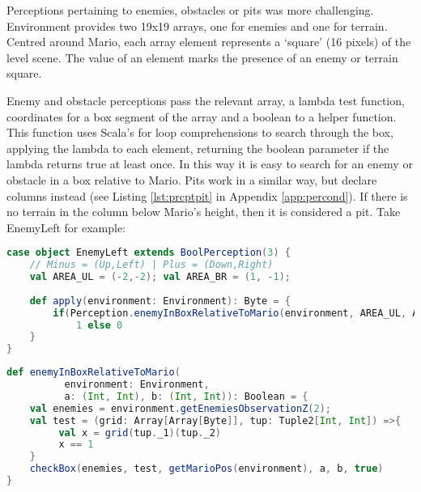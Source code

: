 Perceptions pertaining to enemies, obstacles or pits was more challenging. Environment provides two 19x19 arrays, one for enemies and one for terrain. Centred around Mario, each array element represents a `square' (16 pixels) of the level scene. The value of an element marks the presence of an enemy or terrain square. 

Enemy and obstacle perceptions pass the relevant array, a lambda test function, coordinates for a box segment of the array and a boolean to a helper function. This function uses Scala's for loop comprehensions to search through the box, applying the lambda to each element, returning the boolean parameter if the lambda returns true at least once. In this way it is easy to search for an enemy or obstacle in a box relative to Mario. Pits work in a similar way, but declare columns instead (see Listing \ref{lst:prcptpit} in Appendix \ref{app:percond}). If there is no terrain in the column below Mario's height, then it is considered a pit. Take EnemyLeft for example:

\begin{minipage}{0.9\linewidth}
\centering
\begin{lstlisting}[language=scala]
case object EnemyLeft extends BoolPerception(3) {
    // Minus = (Up,Left) | Plus = (Down,Right)
    val AREA_UL = (-2,-2); val AREA_BR = (1, -1);
  
    def apply(environment: Environment): Byte = {
        if(Perception.enemyInBoxRelativeToMario(environment, AREA_UL, AREA_BR)) 
            1 else 0  
    }
}
\end{lstlisting}
\end{minipage}

\begin{minipage}{0.9\linewidth}
\centering
\begin{lstlisting}[language=scala]
def enemyInBoxRelativeToMario(
          environment: Environment, 
          a: (Int, Int), b: (Int, Int)): Boolean = {
    val enemies = environment.getEnemiesObservationZ(2);
    val test = (grid: Array[Array[Byte]], tup: Tuple2[Int, Int]) =>{
         val x = grid(tup._1)(tup._2)
         x == 1
    }
    checkBox(enemies, test, getMarioPos(environment), a, b, true)
}
\end{lstlisting}
\end{minipage}

